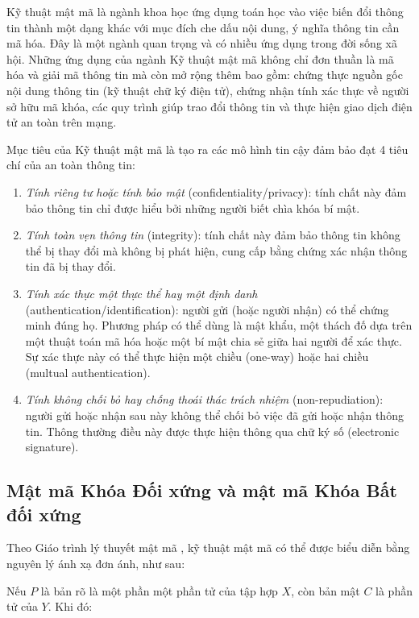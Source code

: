 Kỹ thuật mật mã là ngành khoa học ứng dụng toán học vào việc biến đổi thông tin thành một dạng khác với mục đích che dấu nội dung, ý nghĩa thông tin cần mã hóa. Đây là một ngành quan trọng và có nhiều ứng dụng trong đời sống xã hội. Những ứng dụng của ngành Kỹ thuật mật mã không chỉ đơn thuần là mã hóa và giải mã thông tin mà còn mở rộng thêm bao gồm: chứng thực nguồn gốc nội dung thông tin (kỹ thuật chữ ký điện tử), chứng nhận tính xác thực về người sở hữu mã khóa, các quy trình giúp trao đổi thông tin và thực hiện giao dịch điện tử an toàn trên mạng.

Mục tiêu của Kỹ thuật mật mã là tạo ra các mô hình tin cậy đảm bảo đạt 4 tiêu chí của an toàn thông tin:

\begin{enumerate}

\item  \emph{Tính riêng tư hoặc tính bảo mật} (confidentiality/privacy): tính chất này đảm bảo thông tin chỉ được hiểu bởi những người biết chìa khóa bí mật.
\item \emph{Tính toàn vẹn thông tin} (integrity): tính chất này đảm bảo thông tin không thể bị thay đổi mà không bị phát hiện, cung cấp bằng chứng xác nhận thông tin đã bị thay đổi.
\item \emph{Tính xác thực một thực thể hay một định danh} (authentication/identification): người gửi (hoặc người nhận) có thể chứng minh đúng họ. Phương pháp có thể dùng là mật khẩu, một thách đố dựa trên một thuật toán mã hóa hoặc một bí mật chia sẻ giữa hai người để xác thực. Sự xác thực này có thể thực hiện một chiều (one-way) hoặc hai chiều (multual authentication).
\item \emph{Tính không chối bỏ hay chống thoái thác trách nhiệm} (non-repudiation): người gửi hoặc nhận sau này không thể chối bỏ việc đã gửi hoặc nhận thông tin. Thông thường điều này được thực hiện thông qua chữ ký số (electronic signature).

\end{enumerate}

\subsection{Mật mã Khóa Đối xứng và mật mã Khóa Bất đối xứng}

Theo Giáo trình lý thuyết mật mã \cite{lequyetthang2016}, kỹ thuật mật mã có thể được biểu diễn bằng nguyên lý ánh xạ đơn ánh, như sau:

Nếu $P$ là bản rõ là một phần một phần tử của tập hợp $X$, còn bản mật $C$ là phần tử của $Y$. Khi đó:

